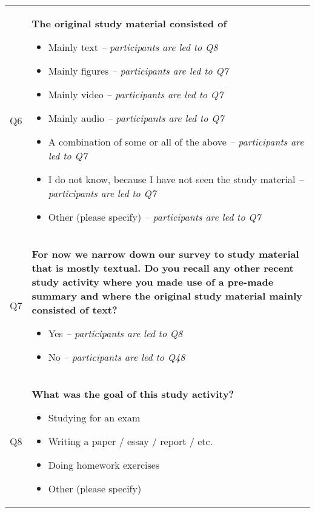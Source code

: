 \begin{xtabular}{@{\,}l <{\hskip 2pt} >{\raggedright\arraybackslash}p{0.82\textwidth}}
        Q6 & \textbf{The original study material consisted of}
        \begin{itemize}[label=$\square$, leftmargin=*, nosep]
          \item Mainly text \textit{-- participants are led to Q8}
          \item Mainly figures \textit{-- participants are led to Q7}
          \item Mainly video \textit{-- participants are led to Q7}
          \item Mainly audio \textit{-- participants are led to Q7}
          \item A combination of some or all of the above \textit{-- participants are led to Q7}
          \item I do not know, because I have not seen the study material \textit{-- participants are led to Q7}
          \item Other (please specify) \textit{-- participants are led to Q7}
        \end{itemize}

        \\

        Q7 & \textbf{For now we narrow down our survey to study material that is mostly textual. Do you recall any other recent study activity where you made use of a pre-made summary and where the original study material mainly consisted of text?}
        \begin{itemize}[label=$\square$, leftmargin=*, nosep]
          \item Yes \textit{-- participants are led to Q8}
          \item No \textit{-- participants are led to Q48}
        \end{itemize}

        \\

        Q8 & \textbf{What was the goal of this study activity?}
        \begin{itemize}[label=$\square$, leftmargin=*, nosep]
          \item Studying for an exam
          \item Writing a paper / essay / report / etc.
          \item Doing homework exercises
          \item Other (please specify)
        \end{itemize}

        \\


\end{xtabular}
